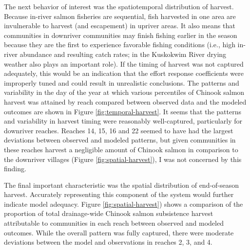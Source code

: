 \documentclass[12pt,]{book}
\theoremstyle{definition}
\theoremstyle{definition}
\theoremstyle{definition}
\theoremstyle{remark}
\begin{document}
The next behavior of interest was the spatiotemporal distribution of
harvest. Because in-river salmon fisheries are sequential, fish
harvested in one area are invulnerable to harvest (and escapement) in
upriver areas. It also means that communities in downriver communities
may finish fishing earlier in the season because they are the first to
experience favorable fishing conditions (i.e., high in-river abundance
and resulting catch rates; in the Kuskokwim River drying weather also
plays an important role). If the timing of harvest was not captured
adequately, this would be an indication that the effort response
coefficients were improperly tuned and could result in unrealistic
conclusions. The patterns and variability in the day of the year at
which various percentiles of Chinook salmon harvest was attained by
reach compared between observed data and the modeled outcomes are shown
in Figure \ref{fig:temporal-harvest}. It seems that the patterns and
variability in harvest timing were reasonably well-captured,
particularly for downriver reaches. Reaches 14, 15, 16 and 22 seemed to
have had the largest deviations between observed and modeled patterns,
but given communities in these reaches harvest a negligible amount of
Chinook salmon in comparison to the downriver villages (Figure
\ref{fig:spatial-harvest}), I was not concerned by this finding.

The final important characteristic was the spatial distribution of
end-of-season harvest. Accurately representing this component of the
system would further indicate model adequacy. Figure
\ref{fig:spatial-harvest}) shows a comparison of the proportion of total
drainage-wide Chinook salmon subsistence harvest attributable to
communities in each reach between observed and modeled outcomes. While
the overall pattern was fully captured, there were moderate deviations
between the model and observations in reaches 2, 3, and 4.

\clearpage
\end{document}
